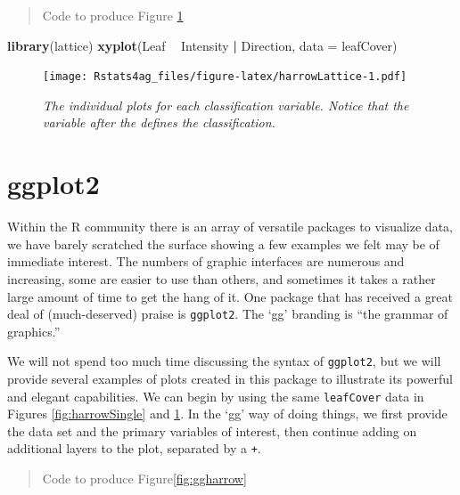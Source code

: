 \documentclass[letterpaper,]{book}
\newenvironment{Shaded}{\begin{snugshade}}{\end{snugshade}}
\newcommand{\DataTypeTok}[1]{\textcolor[rgb]{0.13,0.29,0.53}{#1}}
\newcommand{\KeywordTok}[1]{\textcolor[rgb]{0.13,0.29,0.53}{\textbf{#1}}}
\newcommand{\NormalTok}[1]{#1}
\newcommand{\OperatorTok}[1]{\textcolor[rgb]{0.81,0.36,0.00}{\textbf{#1}}}
\newcommand{\StringTok}[1]{\textcolor[rgb]{0.31,0.60,0.02}{#1}}
\begin{document}
\begin{quote}
Code to produce Figure \ref{fig:harrowLattice}
\end{quote}

\begin{Shaded}
\begin{Highlighting}[]
\KeywordTok{library}\NormalTok{(lattice)}
\KeywordTok{xyplot}\NormalTok{(Leaf }\OperatorTok{~}\StringTok{ }\NormalTok{Intensity }\OperatorTok{|}\StringTok{ }\NormalTok{Direction, }\DataTypeTok{data =}\NormalTok{ leafCover)}
\end{Highlighting}
\end{Shaded}

\begin{figure}
\centering
\texttt{[image: Rstats4ag\_files/figure-latex/harrowLattice-1.pdf]}
\caption{\label{fig:harrowLattice}\emph{The individual plots for each classification variable. Notice that the variable after the \texttt{\textbar{}} defines the classification.}}
\end{figure}

\hypertarget{ggplot2}{%
\section{ggplot2}\label{ggplot2}}

Within the R community there is an array of versatile packages to visualize data, we have barely scratched the surface showing a few examples we felt may be of immediate interest. The numbers of graphic interfaces are numerous and increasing, some are easier to use than others, and sometimes it takes a rather large amount of time to get the hang of it. One package that has received a great deal of (much-deserved) praise is \texttt{ggplot2}. The `gg' branding is ``the grammar of graphics.''

We will not spend too much time discussing the syntax of \texttt{ggplot2}, but we will provide several examples of plots created in this package to illustrate its powerful and elegant capabilities. We can begin by using the same \texttt{leafCover} data in Figures \ref{fig:harrowSingle} and \ref{fig:harrowLattice}. In the `gg' way of doing things, we first provide the data set and the primary variables of interest, then continue adding on additional layers to the plot, separated by a \texttt{+}.

\begin{quote}
Code to produce Figure\ref{fig:ggharrow}
\end{quote}
\end{document}
